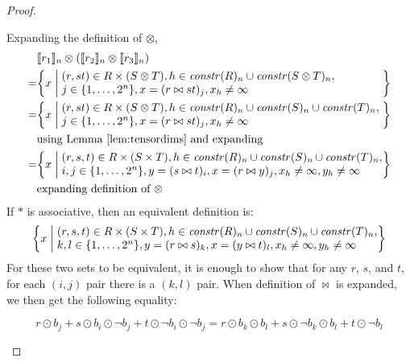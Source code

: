 \begin{proof}
\begin{description}
    Expanding the definition of $\otimes$,
%
    \begin{align*}
        & \interp{r_1}_n \otimes (\interp{r_2}_n \otimes \interp{r_3}_n) \\
      = & \bigg\{ x \; \bigg| \; 
            \parbox{10cm}{
              $(r,st) \in R \times (S \otimes T),
               h \in \effdims{R}{n} \cup \effdims{S \otimes T}{n},$ \\
              $j \in \{ 1, \ldots, 2^n \},
                 x = (r \bowtie st)_j, x_h \neq \infty$
            } \bigg\} \\
      = & \bigg\{ x \; \bigg| \; 
            \parbox{10cm}{
              $(r,st) \in R \times (S \otimes T),
               h \in \effdims{R}{n} \cup \effdims{S}{n} \cup \effdims{T}{n},$ \\
              $j \in \{ 1, \ldots, 2^n \},
                 x = (r \bowtie st)_j, x_h \neq \infty$
            } \bigg\} \\
        & \mbox{using Lemma~\ref{lem:tensordims} and expanding} \\
      = & \bigg\{ x \; \bigg| \; 
            \parbox{10cm}{
              $(r,s,t) \in R \times (S \times T),
               h \in \effdims{R}{n} \cup \effdims{S}{n} \cup \effdims{T}{n},$ \\
              $i,j \in \{ 1, \ldots, 2^n \},
                y = (s \bowtie t)_i, x = (r \bowtie y)_j,
                x_h \neq \infty, y_h \neq \infty$
            } \bigg\} \\
        & \mbox{expanding definition of $\otimes$} \\
    \end{align*}
%
    If $\ast$ is associative, then an equivalent definition is:
    \begin{equation*}
          \bigg\{ x \; \bigg| \; 
            \parbox{10cm}{
              $(r,s,t) \in R \times (S \times T),
               h \in \effdims{R}{n} \cup \effdims{S}{n} \cup \effdims{T}{n},$ \\
              $k,l \in \{ 1, \ldots, 2^n \},
                y = (r \bowtie s)_k, x = (y \bowtie t)_l,
                x_h \neq \infty, y_h \neq \infty$
            } \bigg\}
    \end{equation*}
%
    For these two sets to be equivalent, it is enough to show that for any $r$,
    $s$, and $t$, for each $(i,j)$ pair there is a $(k,l)$ pair. When definition
    of $\bowtie$ is expanded, we then get the following equality:

    $$r \odot b_j + s \odot b_i \odot \neg b_j + t \odot \neg b_i \odot \neg b_j
    = r \odot b_k \odot b_l + s \odot \neg b_k \odot b_l + t \odot \neg b_l$$


\end{description}
\end{proof}
